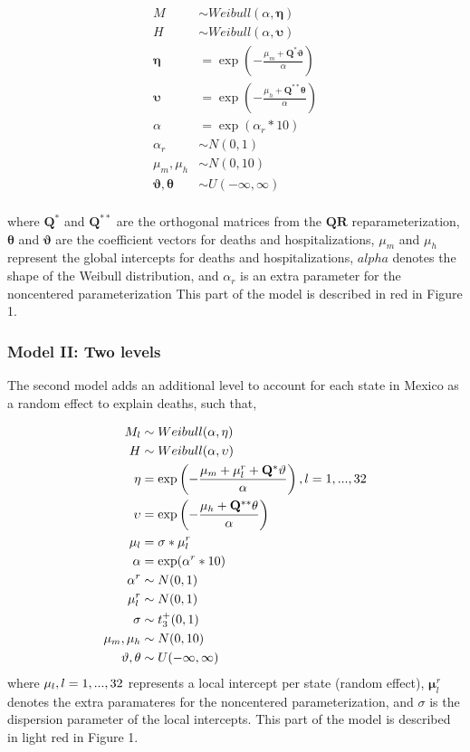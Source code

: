 \documentclass[10pt,letterpaper]{article}
\begin{document}
\[
\begin{aligned}
 {M}  &\sim Weibull(\alpha,\mathbf{\eta})\\
 {H}  &\sim Weibull(\alpha,\mathbf{\upsilon}) \\
 \mathbf{\eta} &= \exp\left(-\frac{\mu_m+\mathbf{Q}^*\mathbf{\vartheta}}{\alpha}\right) \\
 \mathbf{\upsilon} &= \exp\left(-\frac{\mu_h+\mathbf{Q}^{**}\mathbf{\theta}}{\alpha}\right) \\
 \alpha&=\exp(\alpha_r*10) \\
 \alpha_r&\sim N(0,1) \\
 \mu_m,\mu_h &\sim N(0,10) \\
 \mathbf{\vartheta},\mathbf{\theta} &\sim U(-\infty,\infty) \\
\end{aligned}
\]

where \(\mathbf{Q}^*\) and \(\mathbf{Q}^{**}\) are the orthogonal
matrices from the \(\mathbf{QR}\) reparameterization,
\(\mathbf{\theta}\) and \(\mathbf{\vartheta}\) are the coefficient
vectors for deaths and hospitalizations, \(\mu_m\) and \(\mu_h\)
represent the global intercepts for deaths and hospitalizations,
\(alpha\) denotes the shape of the Weibull distribution, and
\(\alpha_r\) is an extra parameter for the noncentered parameterization
This part of the model is described in red in Figure 1.

\hypertarget{model-ii-two-levels}{%
\subsubsection{Model II: Two levels}\label{model-ii-two-levels}}

The second model adds an additional level to account for each state in
Mexico as a random effect to explain deaths, such that,

\[
\begin{aligned}
 M_l   &\sim Weibull(\alpha,\mathbf{\eta})\\
 H  &\sim Weibull(\alpha,\mathbf{\upsilon}) \\
 \mathbf{\eta} &= \exp\left(-\frac{\mu_m+\mathbf{\mu}_l^r+\mathbf{Q}^*\mathbf{\vartheta}}{\alpha}\right),\space\space l=1,...,32\\
 \mathbf{\upsilon} &= \exp\left(-\frac{\mu_h+\mathbf{Q}^{**}\mathbf{\theta}}{\alpha}\right) \\
 \mathbf{\mu}_l&=\sigma*\mathbf{\mu}_l^r \\
 \alpha&=\exp(\alpha^r*10) \\
 \alpha^r&\sim N(0,1) \\
 \mu^r_l&\sim N(0,1) \\
 \sigma&\sim t^+_3(0,1) \\
 \mu_m,\mu_h &\sim N(0,10) \\
 \mathbf{\vartheta},\mathbf{\theta} &\sim U(-\infty,\infty) \\
\end{aligned}
\] where \(\mathbf{\mu}_l, \space l=1,...,32\) represents a local
intercept per state (random effect), \(\mathbf{\mu}^r_l\) denotes the
extra paramateres for the noncentered parameterization, and \(\sigma\)
is the dispersion parameter of the local intercepts. This part of the
model is described in light red in Figure 1.
\end{document}
